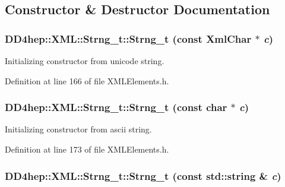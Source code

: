 \subsection{Constructor \& Destructor Documentation}
\hypertarget{class_d_d4hep_1_1_x_m_l_1_1_strng__t_a172f140c427ae76165669b5822588e6e}{
\subsubsection[{Strng\_\-t}]{\setlength{\rightskip}{0pt plus 5cm}DD4hep::XML::Strng\_\-t::Strng\_\-t (const {\bf XmlChar} $\ast$ {\em c})}}
\label{class_d_d4hep_1_1_x_m_l_1_1_strng__t_a172f140c427ae76165669b5822588e6e}


Initializing constructor from unicode string. 

Definition at line 166 of file XMLElements.h.\hypertarget{class_d_d4hep_1_1_x_m_l_1_1_strng__t_ac846845ea068229d358849a6be38481e}{
\subsubsection[{Strng\_\-t}]{\setlength{\rightskip}{0pt plus 5cm}DD4hep::XML::Strng\_\-t::Strng\_\-t (const char $\ast$ {\em c})}}
\label{class_d_d4hep_1_1_x_m_l_1_1_strng__t_ac846845ea068229d358849a6be38481e}


Initializing constructor from ascii string. 

Definition at line 173 of file XMLElements.h.\hypertarget{class_d_d4hep_1_1_x_m_l_1_1_strng__t_a494da46642509d83375a96a6ce725ad4}{
\subsubsection[{Strng\_\-t}]{\setlength{\rightskip}{0pt plus 5cm}DD4hep::XML::Strng\_\-t::Strng\_\-t (const std::string \& {\em c})}}
\label{class_d_d4hep_1_1_x_m_l_1_1_strng__t_a494da46642509d83375a96a6ce725ad4}


